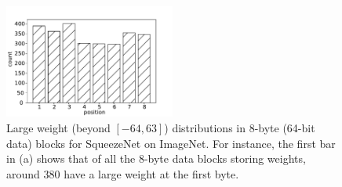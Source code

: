 \documentclass{article}
\begin{document}

\begin{figure}
\includegraphics[width=0.5\textwidth]{NeuRIPS2019/images/position/large_weight_distribution_squeezenetImagenet.pdf}
\caption{Large weight (beyond $[-64, 63]$) distributions in 8-byte (64-bit data) blocks for SqueezeNet on ImageNet. For instance, the first bar in (a) shows that of all the 8-byte data blocks storing  weights, around 380 have a large weight at the first byte.}
\label{fig:large_weight_distribution}
\end{figure}
\end{document}
